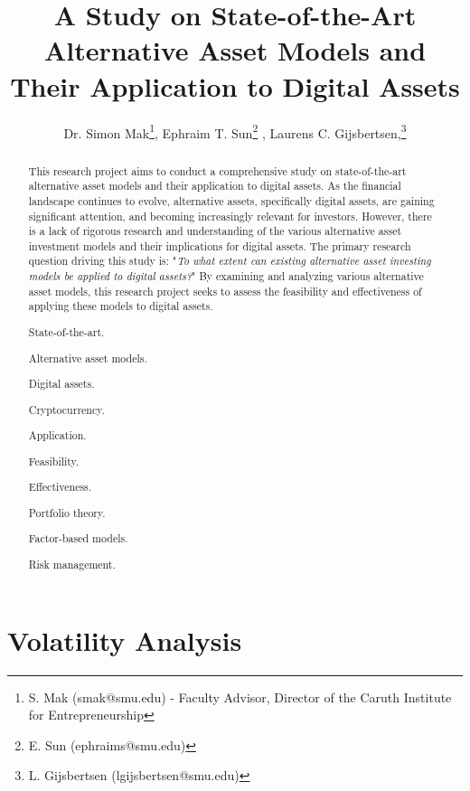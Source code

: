 \documentclass{ledger}
\title{A Study on State-of-the-Art Alternative Asset Models and Their Application to Digital Assets
}
\author{Dr. Simon Mak\thanks{S. Mak (smak@smu.edu) - Faculty Advisor, Director of the Caruth Institute for Entrepreneurship}, Ephraim T. Sun\thanks{E. Sun (ephraims@smu.edu)} , Laurens C. Gijsbertsen,\thanks{L. Gijsbertsen (lgijsbertsen@smu.edu)}}
\begin{document}
\maketitle

\thispagestyle{pagefirst}

\begin{abstract}
This research project aims to conduct a comprehensive study on state-of-the-art alternative asset models and their application to digital assets. As the financial landscape continues to evolve, alternative assets, specifically digital assets, are gaining significant attention, and becoming increasingly relevant for investors. However, there is a lack of rigorous research and understanding of the various alternative asset investment models and their implications for digital assets. The primary research question driving this study is: "\textit{To what extent can existing alternative asset investing models be applied to digital assets?}" By examining and analyzing various alternative asset models, this research project seeks to assess the feasibility and effectiveness of applying these models to digital assets.

\begin{keywords}
\item State-of-the-art.
\item Alternative asset models.
\item Digital assets.
\item Cryptocurrency.
\item Application.
\item Feasibility.
\item Effectiveness.
\item Portfolio theory.
\item Factor-based models.
\item Risk management.
\end{keywords}
\end{abstract}












\section{Volatility Analysis}
\end{document}
